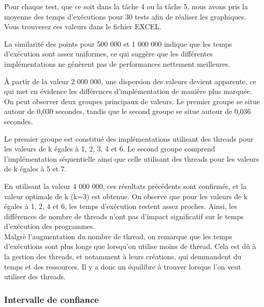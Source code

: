 \documentclass[
    ]{article}
\begin{document}
Pour chaque test, que ce soit dans la tâche 4 ou la tâche 5, nous avons
pris la moyenne des temps d'exécutions pour 30 tests afin de réaliser
les graphiques. Vous trouverez ces valeurs dans le fichier EXCEL.

La similarité des points pour 500 000 et 1 000 000 indique que les temps
d'exécution sont assez uniformes, ce qui suggère que les différentes
implémentations ne génèrent pas de performances nettement meilleures.

À partir de la valeur 2 000 000, une dispersion des valeurs devient
apparente, ce qui met en évidence les différences d'implémentation de
manière plus marquée. On peut observer deux groupes principaux de
valeurs. Le premier groupe se situe autour de 0,030 secondes, tandis que
le second groupe se situe autour de 0,036 secondes.

Le premier groupe est constitué des implémentations utilisant des
threads pour les valeurs de k égales à 1, 2, 3, 4 et 6. Le second groupe
comprend l'implémentation séquentielle ainsi que celle utilisant des
threads pour les valeurs de k égales à 5 et 7.

En utilisant la valeur 4 000 000, ces résultats précédents sont
confirmés, et la valeur optimale de k (k=3) est obtenue. On observe que
pour les valeurs de k égales à 1, 2, 4 et 6, les temps d'exécution
restent assez proches. Ainsi, les différences de nombre de threads n'ont
pas d'impact significatif sur le temps d'exécution des programmes.\\
Malgrè l'augmentation du nombre de thread, on remarque que les temps
d'exécutions sont plus longs que lorsqu'on utilise moins de thread. Cela
est dû à la gestion des threads, et notamment à leurs créations, qui
demmandent du temps et des ressources. Il y a donc un équilibre à
trouver lorsque l'on veut utiliser des threads.

\hypertarget{intervalle-de-confiance}{%
\subsubsection{Intervalle de confiance}\label{intervalle-de-confiance}}
\end{document}
